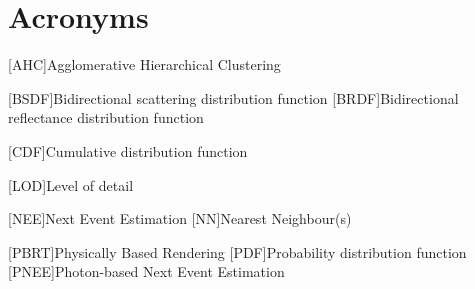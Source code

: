 \newpage
\section*{Acronyms}

\begin{acronym}[ECU]


[AHC]{Agglomerative Hierarchical Clustering}


[BSDF]{Bidirectional scattering distribution function}
[BRDF]{Bidirectional reflectance distribution function}

[CDF]{Cumulative distribution function}

[LOD]{Level of detail}

[NEE]{Next Event Estimation}
[NN]{Nearest Neighbour(s)}

[PBRT]{Physically Based Rendering}
[PDF]{Probability distribution function}
[PNEE]{Photon-based Next Event Estimation}


\end{acronym}
